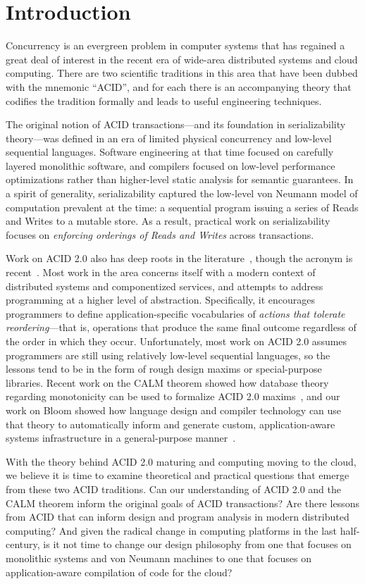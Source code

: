 \documentclass{sig-alternate}
\begin{document}
\section{Introduction}
Concurrency is an evergreen problem in computer systems that has regained a
great deal of interest in the recent era of wide-area distributed systems and
cloud computing.  There are two scientific traditions in this area that have
been dubbed with the mnemonic ``ACID'', and for each there is an
accompanying theory that codifies the tradition formally and leads to useful
engineering techniques.

The original notion of ACID transactions---and its foundation in serializability theory---was defined in an era of limited physical concurrency and low-level sequential languages.  Software engineering at that time focused on carefully layered monolithic software, and compilers focused on low-level performance optimizations rather than higher-level static analysis for semantic guarantees.  In a spirit of generality, serializability captured the low-level von Neumann model of computation prevalent at the time: a sequential program issuing a series of Reads and Writes to a mutable store.  As a result, practical work on serializability focuses on \emph{enforcing orderings of Reads and Writes} across transactions.

Work on ACID 2.0 also has deep roots in the literature~\cite{Fischer1982}, though the acronym is recent~\cite{Helland2009}.  Most work in the area concerns itself with a modern context of distributed systems and componentized services, and attempts to address programming at a higher level of abstraction.  Specifically,  it encourages programmers to define application-specific vocabularies of \emph{actions that tolerate reordering}---that is, operations
that produce the same final outcome regardless of the order in which they occur.  
Unfortunately, most work on ACID 2.0 assumes programmers are still using relatively low-level sequential languages, so the lessons tend to be in the form of rough design maxims or special-purpose libraries.  Recent work on the CALM theorem showed how database theory regarding monotonicity can be used to formalize ACID 2.0 maxims~\cite{Alvaro2011,Ameloot2011,Conway2012,Hellerstein2010}, and our work on Bloom showed how language design and compiler technology can use that theory to automatically inform and generate custom, application-aware systems infrastructure in a general-purpose manner~\cite{Alvaro2011}.  

With the theory behind ACID 2.0 maturing and computing moving to the cloud, we believe it is time to examine theoretical and practical questions that emerge from these two ACID traditions. Can our understanding of ACID 2.0 and the CALM theorem inform the original goals of ACID transactions?  Are there lessons from ACID that can inform design and program analysis in modern distributed computing?  And given the radical change in computing platforms in the last half-century, is it not time to change our design philosophy from one that focuses on monolithic systems and von Neumann machines to one that focuses on application-aware compilation of code for the cloud?
\end{document}
